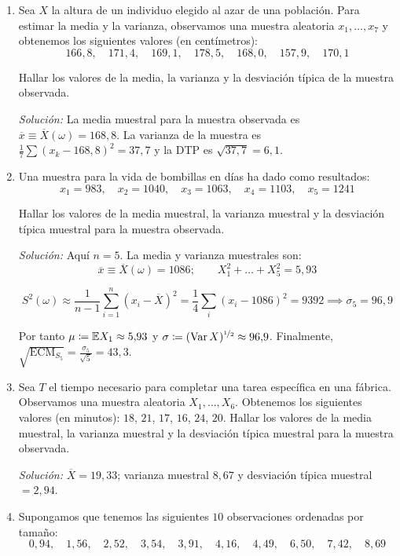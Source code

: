 \begin{enumerate}
  \item Sea $X$ la altura de un individuo elegido al azar de una población. Para estimar la media y la varianza, observamos una muestra aleatoria $x_1, \dots, x_7$ y obtenemos los siguientes valores (en centímetros):
  \[
    166{,}8, \quad 171{,}4, \quad 169{,}1, \quad 178{,}5, \quad 168{,}0, \quad 157{,}9, \quad 170{,}1
  \]
 
  Hallar los valores de la media, la varianza y la desviación típica de la muestra observada.

  \smallskip
  \noindent\textit{Solución:} La media muestral para la muestra observada es $\overline{x} \equiv \overline{X}(\omega) = 168{,}8$. La varianza de la muestra es $\frac{1}{7}\sum (x_k - 168{,}8)^2 = 37{,}7$ y la DTP es $\sqrt{37{,}7} = 6{,}1$.

  \item Una muestra para la vida de bombillas en días ha dado como resultados:
  \[
    x_1 = 983, \quad x_2 = 1040, \quad x_3 = 1063, \quad x_4 = 1103, \quad x_5 = 1241
  \]
 
  Hallar los valores de la media muestral, la varianza muestral y la desviación típica muestral para la muestra observada.

  \smallskip
  \noindent\textit{Solución:} Aquí $n = 5$. La media y varianza muestrales son:
  \[
    \overline{x} \equiv \overline{X}(\omega) = 1086; \qquad X_1^2 + \dots + X_5^2 = 5{,}93
  \]
 
  \[
    S^2(\omega) \approx \frac{1}{n-1}\sum_{i=1}^n (x_i - \overline{X})^2 = \frac{1}{4}\sum_i (x_i - 1086)^2 = 9392 \implies \sigma_5 = 96{,}9
  \]
 
  Por tanto $\mu \coloneqq \mathbb{E} X_1 \approx 5{,}93$ y $\sigma \coloneqq (\operatorname{Var} X)^{\nicefrac{1}{2}} \approx 96{,}9$. Finalmente, $\sqrt{\operatorname{ECM}_{S_5}} = \frac{\sigma_5}{\sqrt{5}} = 43{,}3$.

  \item Sea $T$ el tiempo necesario para completar una tarea específica en una fábrica. Observamos una muestra aleatoria $X_1, \dots, X_6$. Obtenemos los siguientes valores (en minutos): $18$, $21$, $17$, $16$, $24$, $20$. Hallar los valores de la media muestral, la varianza muestral y la desviación típica muestral para la muestra observada.

  \smallskip
  \noindent\textit{Solución:} $\overline{X} = 19{,}33$; varianza muestral $8{,}67$ y desviación típica muestral $= 2{,}94$.

  \item Supongamos que tenemos las siguientes $10$ observaciones ordenadas por tamaño:
  \[
    0{,}94, \quad 1{,}56, \quad 2{,}52, \quad 3{,}54, \quad 3{,}91, \quad 4{,}16, \quad 4{,}49, \quad 6{,}50, \quad 7{,}42, \quad 8{,}69
  \]
 

\end{enumerate}
